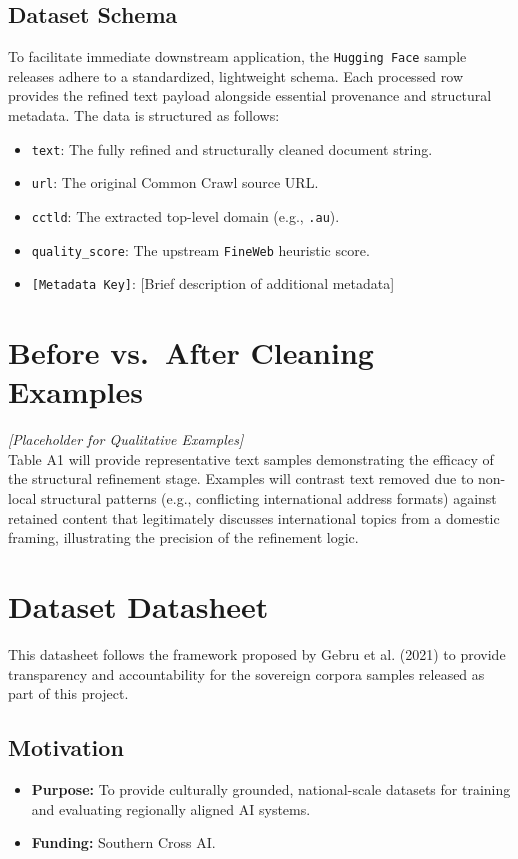 \documentclass[11pt, a4paper]{article}
\begin{document}
\subsection*{Dataset Schema}
To facilitate immediate downstream application, the \texttt{Hugging Face} sample releases adhere to a standardized, lightweight schema. Each processed row provides the refined text payload alongside essential provenance and structural metadata. The data is structured as follows:
\begin{itemize}[noitemsep]
    \item \texttt{text}: The fully refined and structurally cleaned document string.
    \item \texttt{url}: The original Common Crawl source URL.
    \item \texttt{cctld}: The extracted top-level domain (e.g., \texttt{.au}).
    \item \texttt{quality\_score}: The upstream \texttt{FineWeb} heuristic score.
    \item \texttt{[Metadata Key]}: [Brief description of additional metadata]
\end{itemize}

\appendix
\section{Before vs.\ After Cleaning Examples}

\textit{[Placeholder for Qualitative Examples]} \\
Table A1 will provide representative text samples demonstrating the efficacy of the structural refinement stage. Examples will contrast text removed due to non-local structural patterns (e.g., conflicting international address formats) against retained content that legitimately discusses international topics from a domestic framing, illustrating the precision of the refinement logic.

\section{Dataset Datasheet}
This datasheet follows the framework proposed by Gebru et al. (2021) to provide transparency and accountability for the sovereign corpora samples released as part of this project.

\subsection{Motivation}
\begin{itemize}[noitemsep]
    \item \textbf{Purpose:} To provide culturally grounded, national-scale datasets for training and evaluating regionally aligned AI systems.
    \item \textbf{Funding:} Southern Cross AI.
\end{itemize}
\end{document}
